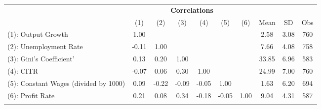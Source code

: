 \begin{center}
\begin{tabular}{lccccccccc}
\hline \noalign{\smallskip} & \multicolumn{6}{c}{\textbf{Correlations}} & \vline \multicolumn{3}{c}{\textbf{Statistics}} &  &  &  &  &  &  & \\
 & (1) & (2) & (3) & (4) & (5) & (6) & Mean & SD & Obs\\
\noalign{\smallskip}\hline \noalign{\smallskip}(1): Output Growth & 1.00 &  &  &  &  &  & 2.58 & 3.08 & 760\\
(2): Unemployment Rate & -0.11 & 1.00 &  &  &  &  & 7.66 & 4.08 & 758\\
(3): Gini's Coefficient' & 0.13 & 0.20 & 1.00 &  &  &  & 33.85 & 6.96 & 583\\
(4): CITR & -0.07 & 0.06 & 0.30 & 1.00 &  &  & 24.99 & 7.00 & 760\\
(5): Constant Wages (divided by 1000) & 0.09 & -0.22 & -0.09 & -0.05 & 1.00 &  & 1.63 & 6.20 & 694\\
(6): Profit Rate & 0.21 & 0.08 & 0.34 & -0.18 & -0.05 & 1.00 & 9.04 & 4.31 & 587\\
\noalign{\smallskip}\hline\end{tabular}\\
\end{center}
